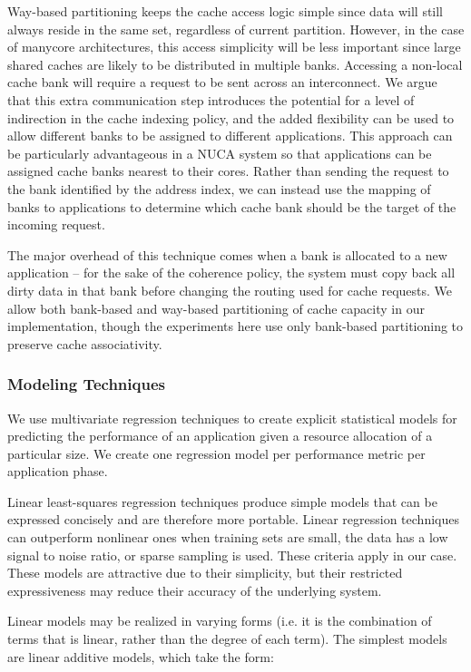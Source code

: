 Way-based partitioning keeps the cache access logic simple since data will still always reside in the same set, regardless of current partition.  However, in the case of manycore architectures, this access simplicity will be less important since large shared caches are likely to be distributed in multiple banks.  Accessing a non-local cache bank will require a request to be sent across an interconnect. We argue that this extra communication step introduces the potential for a level of indirection in the cache indexing policy, and the added flexibility can be used to allow different banks to be assigned to different applications. This approach can be particularly advantageous in a NUCA system so that applications can be assigned cache banks nearest to their cores. Rather than sending the request to the bank identified by the address index, we can instead use the mapping of banks to applications to determine which cache bank should be the target of the incoming request.

The major overhead of this technique comes when a bank is allocated to a new application -- for the sake of the coherence policy, the system must copy back all dirty data in that bank before changing the routing used for cache requests.  We allow both bank-based and way-based partitioning of cache capacity in our implementation, though the experiments here use only bank-based partitioning to preserve cache associativity.



\subsubsection*{Modeling Techniques}
We use multivariate regression techniques to create explicit statistical models for predicting the performance of an application given a resource allocation of a particular size.  We create one regression model per performance metric per application phase.

Linear least-squares regression techniques produce simple models that can be expressed concisely and are therefore more portable. Linear regression techniques can outperform nonlinear ones when training sets are small, the data has a low signal to noise ratio, or sparse sampling is used\cite{hastie}. These criteria apply in our case. These models are attractive due to their simplicity, but their restricted expressiveness may reduce their accuracy of the underlying system.

Linear models may be realized in varying forms (i.e. it is the combination of terms that is linear, rather than the degree of each term).  The simplest models are linear additive models, which take the form:

